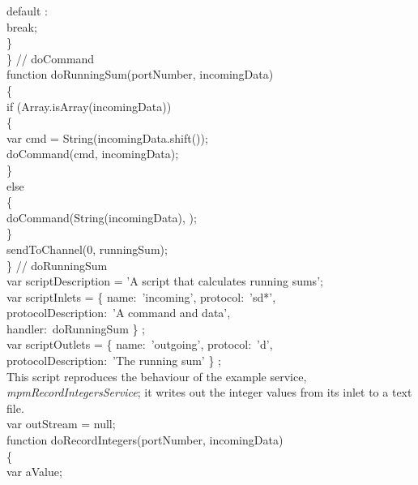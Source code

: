 \tS\tS{}default :\\
\tS\tS\tS{}break;\\
            
\tS\}\\
\} // doCommand\\
\newpage
function doRunningSum(portNumber, incomingData)\\
\{\\
\tS{}if (Array.isArray(incomingData))\\
\tS\{\\
\tS\tS{}var cmd = String(incomingData.shift());\\
        
\tS\tS{}doCommand(cmd, incomingData);\\
\tS\}\\
\tS{}else\\
\tS\{\\
\tS\tS{}doCommand(String(incomingData), \openSq{}\closeSq);\\
\tS\}\\
\tS{}sendToChannel(0, runningSum);\\
\} // doRunningSum\\

var scriptDescription = 'A script that calculates running sums';\\

var scriptInlets = \openSq{} \{ name:\ 'incoming', protocol:\ 'sd*',\\
\tS\tS\tS\tS\tS\tS\tS\tS\tS\tS{}protocolDescription:\ 'A command and data',\\
\tS\tS\tS\tS\tS\tS\tS\tS\tS\tS{}handler:\ doRunningSum \} \closeSq;\\

var scriptOutlets = \openSq{} \{ name:\ 'outgoing', protocol:\ 'd',\\
\tS\tS\tS\tS\tS\tS\tS\tS\tS\tS{}protocolDescription:\ 'The running sum' \} \closeSq;\\
\codeEnd{}
\secondaryEnd{}
\newpage
{}
This script reproduces the behaviour of the example service,
\emph{mpmRecordIntegersService}; it writes out the integer values from its inlet to a text
file.\\

\codeBegin{}
var outStream = null;\\

function doRecordIntegers(portNumber, incomingData)\\
\{\\
\tS{}var aValue;\\
    
